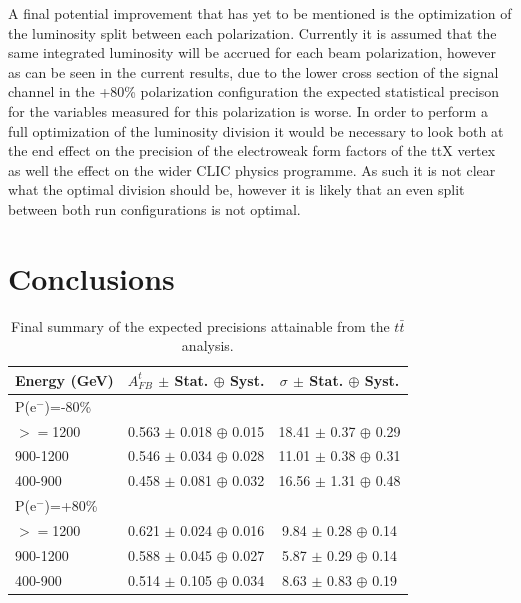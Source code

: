 A final potential improvement that has yet to be mentioned is the optimization of the luminosity split between each polarization. Currently it is assumed that the same integrated luminosity will be accrued for each beam polarization, however as can be seen in the current results, due to the lower cross section of the signal channel in the +80\% polarization configuration the expected statistical precison for the variables measured for this polarization is worse. In order to perform a full optimization of the luminosity division it would be necessary to look both at the end effect on the precision of the electroweak form factors of the ttX vertex as well the effect on the wider \ac{CLIC} physics programme. As such it is not clear what the optimal division should be, however it is likely that an even split between both run configurations is not optimal.

\section{Conclusions}
\begin{table}[t]
  \centering
  \begin{tabular}{l|c|c}
    \toprule
    Energy (GeV) & $A_{FB}^t$ $\pm$ Stat. $\oplus$ Syst. & $\sigma$  $\pm$ Stat. $\oplus$ Syst.   \\
    \midrule
    \midrule
    \multicolumn{3}{l}{ P(e$^-$)=-80\%}\\
    \midrule
    $>=$1200   & 0.563 $\pm$ 0.018 $\oplus$ 0.015 & 18.41 $\pm$ 0.37 $\oplus$ 0.29\\
    \midrule
    900-1200   & 0.546 $\pm$ 0.034 $\oplus$ 0.028 & 11.01 $\pm$ 0.38 $\oplus$ 0.31\\
    \midrule
    400-900    & 0.458 $\pm$ 0.081 $\oplus$ 0.032 & 16.56 $\pm$ 1.31 $\oplus$ 0.48\\
    \midrule
    \midrule
    \multicolumn{3}{l}{ P(e$^-$)=+80\%}\\
    \midrule
    $>=$1200  & 0.621 $\pm$ 0.024 $\oplus$ 0.016 & 9.84 $\pm$ 0.28 $\oplus$ 0.14\\
    \midrule
    900-1200  & 0.588 $\pm$ 0.045 $\oplus$ 0.027 & 5.87 $\pm$ 0.29 $\oplus$ 0.14\\
    \midrule
    400-900   & 0.514 $\pm$ 0.105 $\oplus$ 0.034 & 8.63 $\pm$ 0.83 $\oplus$ 0.19\\
    \bottomrule
  \end{tabular}
  \caption{Final summary of the expected precisions attainable from the $t\bar{t}$ analysis.}
  \label{tab:conclusionnumbers}
\end{table}

